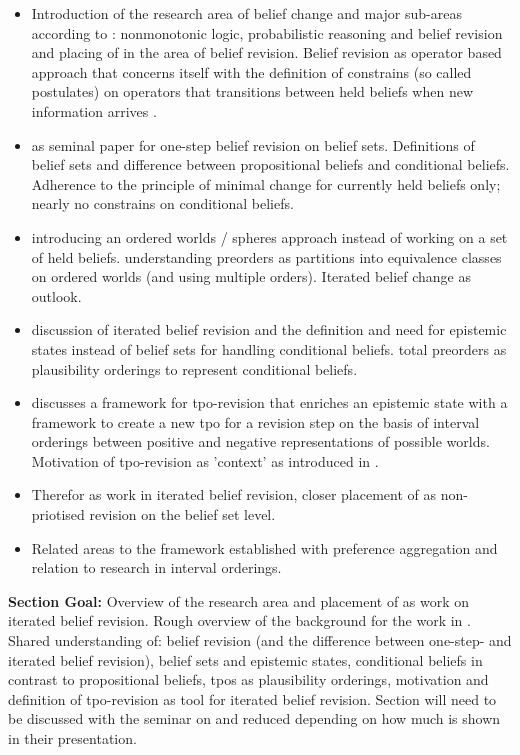 \documentclass[11pt]{scrartcl}
\begin{document}
\begin{itemize}
    \item Introduction of the research area of belief change and major sub-areas according to \cite{Darwiche1997}: nonmonotonic logic, probabilistic reasoning and belief revision and placing of \cite{Booth2011} in the area of belief revision. Belief revision as operator based approach that concerns itself with the definition of constrains (so called postulates) on operators that transitions between held beliefs when new information arrives \cite{Darwiche1997}.
    \item \cite{Alchourron1985} as seminal paper for one-step belief revision on belief sets. Definitions of belief sets and difference between propositional beliefs and conditional beliefs. Adherence to the principle of minimal change for currently held beliefs only; nearly no constrains on conditional beliefs.
    \item \cite{Grove1988} introducing an ordered worlds / spheres approach instead of working on a set of held beliefs. \cite{Booth2004} understanding preorders as partitions into equivalence classes on ordered worlds (and using multiple orders). Iterated belief change as outlook.
    \item \cite{Darwiche1997} discussion of iterated belief revision and the definition and need for epistemic states instead of belief sets for handling conditional beliefs. total preorders as plausibility orderings to represent conditional beliefs.
    \item \cite{Booth2011} discusses a framework for tpo-revision that enriches an epistemic state with a framework to create a new tpo for a revision step on the basis of interval orderings between positive and negative representations of possible worlds. Motivation of tpo-revision as 'context' as introduced in \cite{Booth2007}.
    \item Therefor \cite{Booth2011} as work in iterated belief revision, closer placement of \cite{Booth2011} as non-priotised revision on the belief set level.
    \item Related areas to the framework established \cite{Booth2011} with preference aggregation and relation to research in interval orderings.
\end{itemize}
\textbf{Section Goal:} Overview of the research area and placement of \cite{Booth2011} as work on iterated belief revision. Rough overview of the background for the work in \cite{Booth2011}. Shared understanding of: belief revision (and the difference between one-step- and iterated belief revision), belief sets and epistemic states, conditional beliefs in contrast to propositional beliefs, tpos as plausibility orderings, motivation and definition of tpo-revision as tool for iterated belief revision. Section will need to be discussed with the seminar on \cite{Darwiche1997} and reduced depending on how much is shown in their presentation.
\end{document}
